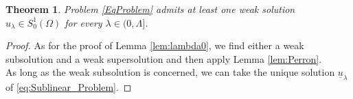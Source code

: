 \documentclass[11pt]{amsart}
\numberwithin{equation}{section} %
\newtheorem{teo}{Theorem}[section]
\theoremstyle{definition}
\begin{document}
\begin{teo}\label{thm:Existence_First}
	Problem \eqref{EqProblem} admits at least
	one weak solution $u_\lambda\in S^{1}_{0}(\Omega)$ for every $\lambda \in (0,\Lambda]$.
\end{teo}
\begin{proof}
	As for the proof of Lemma \ref{lem:lambda0}, we find either a weak subsolution and a weak supersolution and then apply Lemma \ref{lem:Perron}. \\
	As long as the weak subsolution is concerned, we can take the unique solution $\underline{u}_{\lambda}$ of \eqref{eq:Sublinear_Problem}. 
	

\end{proof}
\end{document}
